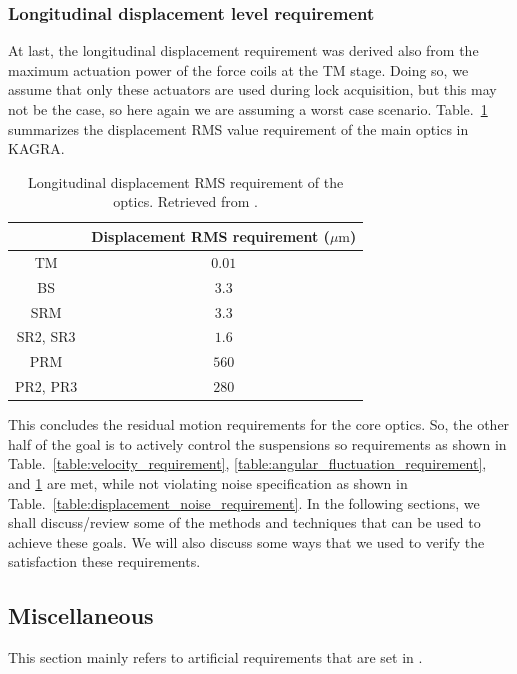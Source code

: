 \subsubsection{Longitudinal displacement level requirement}
At last, the longitudinal displacement requirement was derived also from the maximum actuation power of the force coils at the TM stage.
Doing so, we assume that only these actuators are used during lock acquisition, but this may not be the case, so here again we are assuming a worst case scenario.
Table.~\ref{table:displacement_rms_requirement} summarizes the displacement RMS value requirement of the main optics in KAGRA.
\begin{table}[!h]
	\centering
	\begin{tabular}{|c|c|}
		\hline
		& Displacement RMS requirement ($\mu\mathrm{m}$)\\
		\hline
		TM &  $0.01$\\
		\hline
		BS &  $3.3$\\
		\hline
		SRM & $3.3$\\
		\hline
		SR2, SR3 & $1.6$\\
		\hline
		PRM & $560$\\
		\hline
		PR2, PR3 & $280$\\
		\hline
	\end{tabular}
	\caption{Longitudinal displacement RMS requirement of the optics. Retrieved from \cite{Sekiguchi:2016bmv}.}
	\label{table:displacement_rms_requirement}
\end{table}
This concludes the residual motion requirements for the core optics. 
So, the other half of the goal is to actively control the suspensions so requirements as shown in Table.~\ref{table:velocity_requirement}, \ref{table:angular_fluctuation_requirement}, and \ref{table:displacement_rms_requirement} are met, while not violating noise specification as shown in Table.~\ref{table:displacement_noise_requirement}.
In the following sections, we shall discuss/review some of the methods and techniques that can be used to achieve these goals.
We will also discuss some ways that we used to verify the satisfaction these requirements.

\subsection{Miscellaneous}
This section mainly refers to artificial requirements that are set in \cite{suspension_commissioning}.

